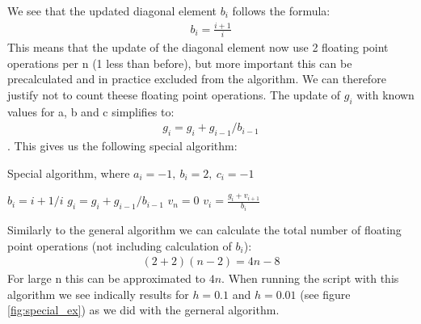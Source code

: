 \documentclass[american,a4paper,12pt]{article}
\begin{document}
We see that the updated diagonal element $b_i$ follows the formula:
\begin{align*}
   b_i = \frac{i+1}{i}
\end{align*}
This means that the update of the diagonal element now use 2 floating point operations per n (1 less than before), but more important this can be precalculated and in practice excluded from the algorithm. We can therefore justify not to count theese floating point operations. The update of $g_i$ with known values for a, b and c simplifies to:
\begin{align*}
  g_i = g_i + g_{i-1}/{b_{i-1}}
\end{align*}
\cite{linalg}. This gives us the following special algorithm:
\begin{algorithm}[H]
\caption{Special algorithm, where $a_i = -1,\ b_i = 2,\ c_i = -1$}
\begin{algorithmic}[1]
   
    \State $b_i = {i+1}/i$
  \EndFor
  \Statex
   
    \State $g_i = g_i + g_{i-1}/{b_{i-1}}$ 
  \EndFor
  \Statex
  \State $v_n = 0$ 
    \State $v_i = \frac{g_i + v_{i+1}}{b_i}$
  \EndFor
\end{algorithmic}
\end{algorithm}
Similarly to the general algorithm we can calculate the total number of floating point operations (not including calculation of $b_i$):
\begin{align*}
  (2 + 2)(n-2) = 4n - 8
\end{align*}
For large n this can be approximated to $4n$. When running the script with this algorithm we see indically results for $h= 0.1$ and $h=0.01$ (see figure \ref{fig:special_ex}) as we did with the gerneral algorithm.
\end{document}
